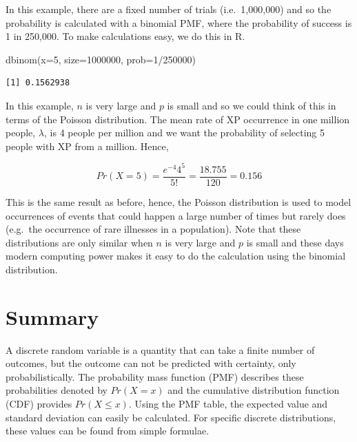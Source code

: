\documentclass[
  oneside]{krantz}
\newenvironment{Shaded}{\begin{snugshade}}{\end{snugshade}}
\newcommand{\AttributeTok}[1]{\textcolor[rgb]{0.77,0.63,0.00}{#1}}
\newcommand{\DecValTok}[1]{\textcolor[rgb]{0.00,0.00,0.81}{#1}}
\newcommand{\FunctionTok}[1]{\textcolor[rgb]{0.00,0.00,0.00}{#1}}
\newcommand{\NormalTok}[1]{#1}
\newcommand{\SpecialCharTok}[1]{\textcolor[rgb]{0.00,0.00,0.00}{#1}}
\begin{document}
In this example, there are a fixed number of trials (i.e.~1,000,000) and so the probability is calculated with a binomial PMF, where the probability of success is 1 in 250,000. To make calculations easy, we do this in R.

\begin{Shaded}
\begin{Highlighting}[]
\FunctionTok{dbinom}\NormalTok{(}\AttributeTok{x=}\DecValTok{5}\NormalTok{, }\AttributeTok{size=}\DecValTok{1000000}\NormalTok{, }\AttributeTok{prob=}\DecValTok{1}\SpecialCharTok{/}\DecValTok{250000}\NormalTok{)}
\end{Highlighting}
\end{Shaded}

\begin{verbatim}
[1] 0.1562938
\end{verbatim}

In this example, \(n\) is very large and \(p\) is small and so we could think of this in terms of the Poisson distribution. The mean rate of XP occurrence in one million people, \(\lambda\), is 4 people per million and we want the probability of selecting 5 people with XP from a million. Hence,

\[Pr(X=5) = \frac{e^{-4}4^5}{5!} = \frac{18.755}{120} = 0.156\]

This is the same result as before, hence, the Poisson distribution is used to model occurrences of events that could happen a large number of times but rarely does (e.g.~the occurrence of rare illnesses in a population). Note that these distributions are only similar when \(n\) is very large and \(p\) is small and these days modern computing power makes it easy to do the calculation using the binomial distribution.

\hypertarget{SUMdiscrv}{%
\section{Summary}\label{SUMdiscrv}}

A discrete random variable is a quantity that can take a finite number of outcomes, but the outcome can not be predicted with certainty, only probabilistically. The probability mass function (PMF) describes these probabilities denoted by \(Pr(X=x)\) and the cumulative distribution function (CDF) provides \(Pr(X \le x)\). Using the PMF table, the expected value and standard deviation can easily be calculated. For specific discrete distributions, these values can be found from simple formulae.
\end{document}
